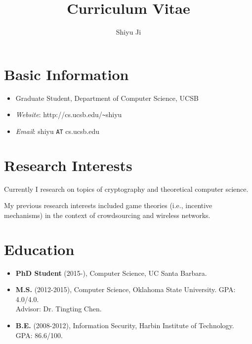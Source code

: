 \documentclass{article}
\begin{document}
\title{\bf Curriculum Vitae}
\author{Shiyu Ji}
\date{}
\maketitle

\section{{Basic Information}}
\begin{itemize}
\item Graduate Student, Department of Computer Science, UCSB
\item {\it Website}: http://cs.ucsb.edu/\verb+~+shiyu
\item {\it Email}: shiyu \verb+AT+ cs.ucsb.edu
\end{itemize}

\section{{Research Interests}}
Currently I research on topics of cryptography and theoretical computer science. 

My previous research interests included game theories (i.e., incentive mechanisms) in the context of crowdsourcing and wireless networks.

\section{{Education}}
\begin{itemize}
\item {\bf PhD Student} (2015-), Computer Science, UC Santa Barbara.

\item {\bf M.S.} (2012-2015), Computer Science, Oklahoma State University. GPA: 4.0/4.0.\\
Advisor: Dr. Tingting Chen.

\item {\bf B.E.} (2008-2012), Information Security, Harbin Institute of Technology. GPA: 86.6/100.
\end{itemize}
\end{document}
